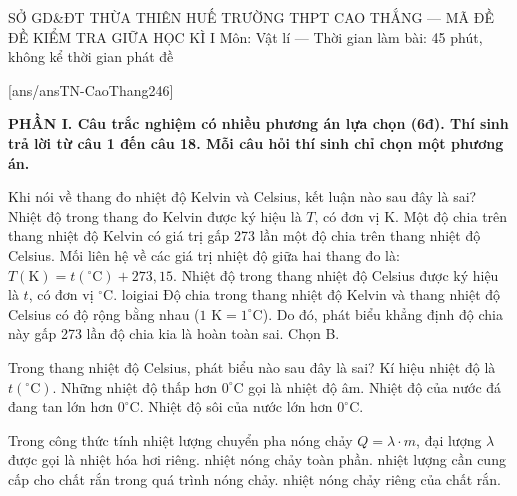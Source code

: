 

\def\toanlop{12}
\def\thoigian{45}
\def\namhoc{2025 - 2026}
\begin{dethi}
	{SỞ GD\&ĐT THỪA THIÊN HUẾ}
	{TRƯỜNG THPT CAO THẮNG --- MÃ ĐỀ \thedeso}
	{ĐỀ KIỂM TRA GIỮA HỌC KÌ I}
	{Môn: Vật lí --- Thời gian làm bài: 45 phút, không kể thời gian phát đề}
\end{dethi}

[ans/ansTN-CaoThang246]

\noindent \textbf{PHẦN I. Câu trắc nghiệm có nhiều phương án lựa chọn (6đ). Thí sinh trả lời từ câu 1 đến câu 18. Mỗi câu hỏi thí sinh chỉ chọn một phương án.}
\vspace{0.2cm}

\begin{ex}%
	Khi nói về thang đo nhiệt độ Kelvin và Celsius, kết luận nào sau đây là sai?
	\choice
	{Nhiệt độ trong thang đo Kelvin được ký hiệu là $T$, có đơn vị K.}
	{\True Một độ chia trên thang nhiệt độ Kelvin có giá trị gấp 273 lần một độ chia trên thang nhiệt độ Celsius.}
	{Mối liên hệ về các giá trị nhiệt độ giữa hai thang đo là: $T(\text{K})=t(^\circ\text{C})+273,15$.}
	{Nhiệt độ trong thang nhiệt độ Celsius được ký hiệu là $t$, có đơn vị $^\circ\text{C}$.}
	loigiai{
		Độ chia trong thang nhiệt độ Kelvin và thang nhiệt độ Celsius có độ rộng bằng nhau ($1\text{ K} = 1^\circ\text{C}$). Do đó, phát biểu khẳng định độ chia này gấp 273 lần độ chia kia là hoàn toàn sai. Chọn B.
	}
\end{ex}

\begin{ex}%
	Trong thang nhiệt độ Celsius, phát biểu nào sau đây là sai?
	\choice
	{Kí hiệu nhiệt độ là $t(^\circ\text{C})$.}
	{Những nhiệt độ thấp hơn $0^\circ\text{C}$ gọi là nhiệt độ âm.}
	{\True Nhiệt độ của nước đá đang tan lớn hơn $0^\circ\text{C}$.}
	{Nhiệt độ sôi của nước lớn hơn $0^\circ\text{C}$.}
\end{ex}

\begin{ex}%
	Trong công thức tính nhiệt lượng chuyển pha nóng chảy $Q = \lambda \cdot m$, đại lượng $\lambda$ được gọi là
	\choice
	{nhiệt hóa hơi riêng.}
	{nhiệt nóng chảy toàn phần.}
	{nhiệt lượng cần cung cấp cho chất rắn trong quá trình nóng chảy.}
	{\True nhiệt nóng chảy riêng của chất rắn.}
\end{ex}

